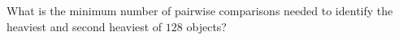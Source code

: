 What is the minimum number of pairwise comparisons needed to identify the heaviest and second heaviest of $128$ objects?
